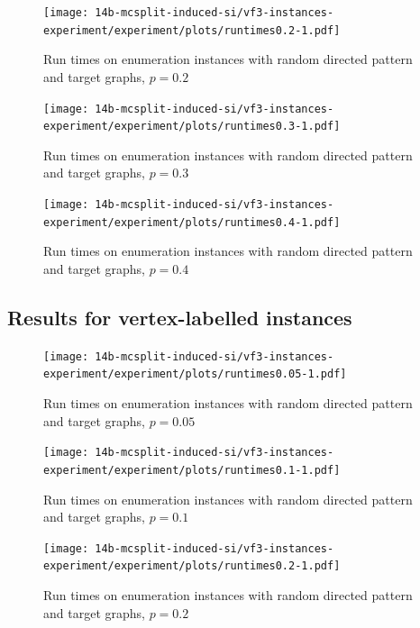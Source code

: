 \begin{figure}[h!]
    \centering
    \texttt{[image: 14b-mcsplit-induced-si/vf3-instances-experiment/experiment/plots/runtimes0.2-1.pdf]}
    \caption{Run times on enumeration instances with random directed pattern and target graphs, $p=0.2$}
    \label{figure:TODO}
\end{figure}

\begin{figure}[h!]
    \centering
    \texttt{[image: 14b-mcsplit-induced-si/vf3-instances-experiment/experiment/plots/runtimes0.3-1.pdf]}
    \caption{Run times on enumeration instances with random directed pattern and target graphs, $p=0.3$}
    \label{figure:TODO}
\end{figure}

\begin{figure}[h!]
    \centering
    \texttt{[image: 14b-mcsplit-induced-si/vf3-instances-experiment/experiment/plots/runtimes0.4-1.pdf]}
    \caption{Run times on enumeration instances with random directed pattern and target graphs, $p=0.4$}
    \label{figure:TODO}
\end{figure}

\subsection{Results for vertex-labelled instances}

\begin{figure}[h!]
    \centering
    \texttt{[image: 14b-mcsplit-induced-si/vf3-instances-experiment/experiment/plots/runtimes0.05-1.pdf]}
    \caption{Run times on enumeration instances with random directed pattern and target graphs, $p=0.05$}
    \label{figure:TODO}
\end{figure}

\begin{figure}[h!]
    \centering
    \texttt{[image: 14b-mcsplit-induced-si/vf3-instances-experiment/experiment/plots/runtimes0.1-1.pdf]}
    \caption{Run times on enumeration instances with random directed pattern and target graphs, $p=0.1$}
    \label{figure:TODO}
\end{figure}

\begin{figure}[h!]
    \centering
    \texttt{[image: 14b-mcsplit-induced-si/vf3-instances-experiment/experiment/plots/runtimes0.2-1.pdf]}
    \caption{Run times on enumeration instances with random directed pattern and target graphs, $p=0.2$}
    \label{figure:TODO}
\end{figure}

